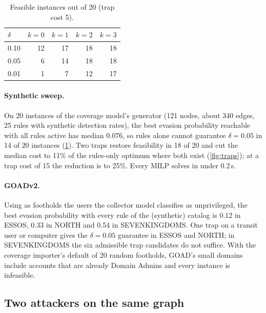 \documentclass[10pt,twocolumn]{article}
\begin{document}
\begin{table}[t]
\centering\small
\caption{Feasible instances out of 20 (trap cost 5).}
\label{tab:feasible}
\begin{tabular}{@{}lrrrr@{}}
\toprule
$\delta$ & $k=0$ & $k=1$ & $k=2$ & $k=3$ \\
\midrule
0.10 & 12 & 17 & 18 & 18 \\
0.05 & 6 & 14 & 18 & 18 \\
0.01 & 1 & 7 & 12 & 17 \\
\bottomrule
\end{tabular}
\end{table}

\paragraph{Synthetic sweep.} On 20 instances of the coverage model's generator (121 nodes, about
340 edges, 25 rules with synthetic detection rates), the best evasion probability reachable
with all rules active has median 0.076, so rules alone cannot guarantee $\delta=0.05$ in 14
of 20 instances (\cref{tab:feasible}). Two traps restore feasibility in 18 of 20 and cut the
median cost to 11\% of the rules-only optimum where both exist (\cref{fig:traps}); at a trap
cost of 15 the reduction is to 25\%. Every MILP solves in under 0.2\,s.

\paragraph{GOADv2.} Using as footholds the users the collector model classifies as unprivileged, the best
evasion probability with every rule of the (synthetic) catalog is 0.12 in ESSOS, 0.33 in
NORTH and 0.54 in SEVENKINGDOMS. One trap on a transit user or computer gives the
$\delta=0.05$ guarantee in ESSOS and NORTH; in SEVENKINGDOMS the six admissible trap
candidates do not suffice. With the coverage importer's default of 20 random footholds, GOAD's small
domains include accounts that are already Domain Admins and every instance is infeasible.

\subsection{Two attackers on the same graph}\label{sec:cross}
\end{document}
